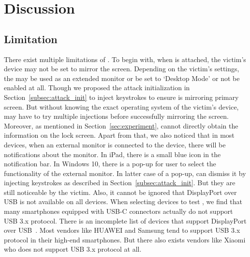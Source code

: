 \section{Discussion}
\label{sec:discussion}

\subsection{Limitation}
There exist multiple limitations of \tool. To begin with, when \tool is attached, the victim's device may not be set to mirror the screen.
Depending on the victim's settings, the \tool may be used as an extended monitor or be set to `Desktop Mode' or not be enabled at all. Though we proposed the attack initialization in Section~\ref{subsec:attack_init} to inject keystrokes to ensure \tool is mirroring primary screen. But without knowing the exact operating system of the victim's device, \tool may have to try multiple injections before successfully mirroring the screen.
Moreover, as mentioned in Section~\ref{sec:experiment}, \tool cannot directly obtain the information on the lock screen.
 Apart from that, we also noticed that in most devices, when an external monitor is connected to the device, there will be notifications about the monitor. In iPad, there is a small blue icon in the notification bar. In Windows 10, there is a pop-up for user to select the functionality of the external monitor. In latter case of a pop-up, \tool can dismiss it by injecting keystrokes as described in Section~\ref{subsec:attack_init}. But they are still noticeable by the victim. Also, it cannot be ignored that DisplayPort over \ac{USB} is not available on all devices. When selecting devices to test \tool, we find that many smartphones equipped with USB-C connectors actually do not support \ac{USB} 3.x protocol. There is an incomplete list of devices that support DisplayPort over \ac{USB}~\cite{usbclist}. Most vendors like HUAWEI and Samsung tend to support \ac{USB} 3.x protocol in their \mbox{high-end} smartphones. But there also exists vendors like Xiaomi who does not support \ac{USB} 3.x protocol at all.

\begin{comment}
There exist multiple limitations of \tool.  To begin with, \tool can only gain
the information and control access of the host itself instead of external
hardware.  Consequently, as we introduced in the
Section~\ref{sec:countermeasures}, \tool can hardly bypass the defense
approaches that use external hardware for authorization.  Moreover, most of
the devices will prompt users to give authentication to the \ac{USB} devices or
select one of the functional modes after they are plugged in.  Though some of
such prompts are not conspicuous for non-experts, especially when \tool is
concealed within other functional hardware such as power banks \shuqing{If
there is experiment, add it here.}, the probability of whether users could get
aware that something unusual happens will increase with the existence of these
prompting messages.
\end{comment}
